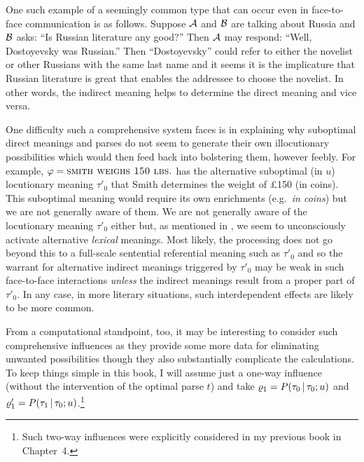 One such example of a seemingly common type that can occur even in face-to-face communication is as follows. Suppose $\cal A$ and $\cal B$ are talking about Russia and $\cal B$ asks: ``Is Russian literature any good?'' Then $\cal A$ may respond: ``Well, Dostoyevsky was Russian.'' Then ``Dostoyevsky'' could refer to either the novelist or other Russians with the same last name and it seems it is the implicature that Russian literature is great that enables the addressee to choose the novelist. In other words, the indirect meaning helps to determine the direct meaning and vice versa.

One difficulty such a comprehensive system faces is in explaining why suboptimal direct meanings and parses do not seem to generate their own illocutionary possibilities which would then feed back into bolstering them, however feebly. For example, $\varphi = \Expression{Smith weighs 150 lbs.}$ has the alternative suboptimal (in $u$) locutionary meaning $\tau'_0$ that Smith determines the weight of \pounds 150 (in coins). This suboptimal meaning would require its own enrichments (e.g.\ \emph{in coins}) but we are not generally aware of them. We are not generally aware of the locutionary meaning $\tau'_0$ either but, as mentioned in , we seem to unconsciously activate alternative \emph{lexical} meanings. Most likely, the processing does not go beyond this to a full-scale sentential referential meaning such as $\tau'_0$ and so the warrant for alternative indirect meanings triggered by $\tau'_0$ may be weak in such face-to-face interactions \emph{unless} the indirect meanings result from a proper part of $\tau'_0$. In any case, in more literary situations, such interdependent effects are likely to be more common.

From a computational standpoint, too, it may be interesting to consider such comprehensive influences as they provide some more data for eliminating unwanted possibilities though they also substantially complicate the calculations. To keep things simple in this book, I will assume just a one-way influence (without the intervention of the optimal parse $t$) and take $\varrho_1 = P(\tau_0 \,|\, \tau_0; u)$ and $\varrho'_1 = P(\tau_1 \,|\, \tau_0; u)$.\footnote{Such two-way influences were explicitly considered in my previous book in Chapter~4.}

